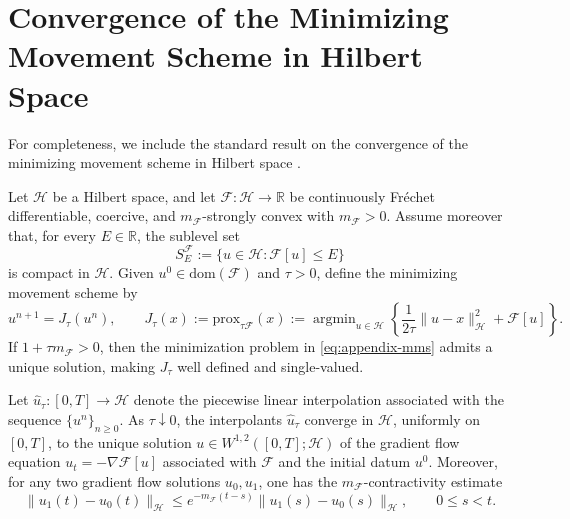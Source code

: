 \documentclass[twoside,11pt]{article}
\newcommand{\prox}{\mathrm{prox}}
\newcommand{\argmin}{\mathop{\mathrm{arg min}}}
\newcommand{\calF}{\mathcal{F}}
\newcommand{\calH}{\mathcal{H}}
\begin{document}
\section{Convergence of the Minimizing Movement Scheme in Hilbert Space}\label{sec:conv-mms}
For completeness, we include the standard result on the convergence of the minimizing movement scheme in Hilbert space \citep{ambrosio2005gradient, mielke2023introduction}.


\begin{theorem}\label{thm:mms-convergence}
Let $\calH$ be a Hilbert space, and let $\calF:\calH\to\mathbb{R}$ be continuously Fr\'echet differentiable, coercive, and $m_{\calF}$-strongly convex with $m_\calF>0$. Assume moreover that, for every $E\in\mathbb{R}$, the sublevel set
\[
S_E^{\calF}:=\{u\in\calH:\calF[u]\le E\}
\]
is compact in $\calH$. Given $u^0\in \mathrm{dom}(\calF)$ and $\tau>0$, define the minimizing movement scheme by
\begin{equation}\label{eq:appendix-mms}
u^{n+1}=J_\tau(u^n),
\qquad
J_\tau(x):=\prox_{\tau\calF}(x)
:=\argmin_{u\in\calH}
\left\{
\frac{1}{2\tau}\|u-x\|_{\calH}^2+\calF[u]
\right\}.
\end{equation}
If $1+\tau m_{\calF}>0$, then the minimization problem in \eqref{eq:appendix-mms} admits a unique solution, making $J_\tau$ well defined and single-valued.

Let $\hat u_\tau:[0,T]\to\calH$ denote the piecewise linear interpolation associated with the sequence $\{u^n\}_{n\ge0}$. As $\tau\downarrow0$, the interpolants $\hat u_\tau$ converge in $\calH$, uniformly on $[0,T]$, to the unique solution
\(
u\in W^{1,2}([0,T];\calH) 
\)
of the gradient flow equation $u_t = - \nabla \calF[u]$ associated with $\calF$ and the initial datum $u^0$. Moreover, for any two gradient flow solutions $u_0,u_1$, one has the $m_{\calF}$-contractivity estimate
\begin{equation*}
\|u_1(t)-u_0(t)\|_{\calH}
\le
e^{-m_{\calF}(t-s)}
\|u_1(s)-u_0(s)\|_{\calH},
\qquad 0\le s<t.
\end{equation*}
\end{theorem}
\end{document}
